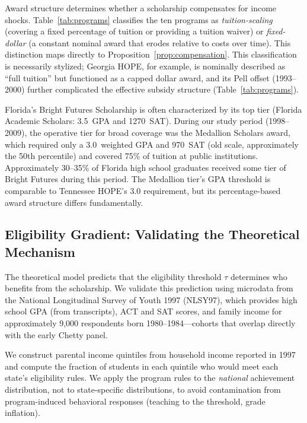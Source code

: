 Award structure determines whether a scholarship compensates for
income shocks. Table~\ref{tab:programs} classifies the ten programs as
\emph{tuition-scaling} (covering a fixed percentage of tuition or
providing a tuition waiver) or \emph{fixed-dollar} (a constant nominal
award that erodes relative to costs over time). This distinction maps
directly to Proposition~\ref{prop:compensation}. This classification
is necessarily stylized; Georgia HOPE, for example, is nominally
described as ``full tuition'' but functioned as a capped dollar award,
and its Pell offset (1993--2000) further complicated the effective
subsidy structure (Table~\ref{tab:programs}).

Florida's Bright Futures Scholarship is often characterized by its
top tier (Florida Academic Scholars: 3.5~GPA and 1270~SAT). During
our study period (1998--2009), the operative tier for broad coverage
was the Medallion Scholars award,
which required only a 3.0~weighted GPA and 970~SAT (old scale,
approximately the 50th percentile) and covered 75\% of tuition at
public institutions. Approximately 30--35\% of Florida high school
graduates received some tier of Bright Futures during this period.
The Medallion tier's GPA threshold is comparable to Tennessee HOPE's
3.0 requirement, but its percentage-based award structure differs
fundamentally.

\subsection{Eligibility Gradient: Validating the Theoretical Mechanism}
\label{sec:data_eligibility}

The theoretical model predicts that the eligibility threshold $\tau$
determines who benefits from the scholarship. We validate this
prediction using microdata from the National Longitudinal Survey of
Youth 1997 (NLSY97), which provides high school GPA (from transcripts),
ACT and SAT scores, and family income for approximately 9,000
respondents born 1980--1984---cohorts that overlap directly with the
early Chetty panel.

We construct parental income quintiles from household income reported in
1997 and compute the fraction of students in each quintile who would
meet each state's eligibility rules. We apply the program rules to the \emph{national} achievement
distribution, not to state-specific distributions, to avoid
contamination from program-induced behavioral responses (teaching to
the threshold, grade inflation).

